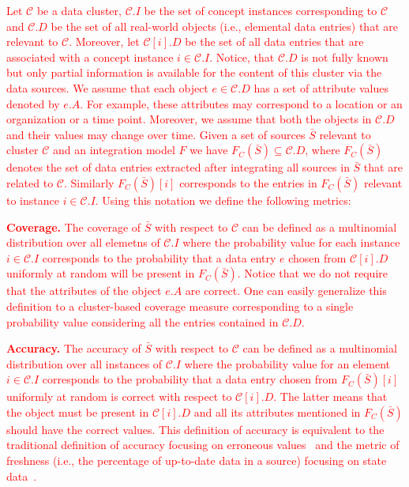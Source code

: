 \documentclass{sig-alternate}
\begin{document}
\textcolor{red}{Let $\mathcal{C}$  be a data cluster,  $\mathcal{C}.I$ be the set of concept instances corresponding to $\mathcal{C}$ and $\mathcal{C}.D$ be the set of all real-world objects (i.e., elemental data entries) that are relevant to $\mathcal{C}$. Moreover, let $\mathcal{C}[i].D$ be the set of all data entries that are associated with a concept instance $i \in \mathcal{C}.I$. Notice, that $\mathcal{C}.D$ is not fully known but only partial information is available for the content of this cluster via the data sources. We assume that each object $e \in \mathcal{C}.D$ has a set of attribute values denoted by $e.A$. For example, these attributes may correspond to a location or an organization or a time point. Moreover, we assume that both the objects in $\mathcal{C}.D$ and their values may change over time. Given a set of sources $\bar{S}$ relevant to cluster $\mathcal{C}$ and an integration model $F$ we have $F_C(\bar{S}) \subseteq \mathcal{C}.D$, where $F_C(\bar{S})$ denotes the set of data entries extracted after integrating all sources in $\bar{S}$ that are related to $\mathcal{C}$. Similarly $F_C(\bar{S})[i]$ corresponds to the entries in $F_C(\bar{S})$ relevant to instance $i \in \mathcal{C}.I$. Using this notation we define the following metrics:}

\textcolor{red}{\vspace{3pt}\noindent\textbf{Coverage.} The coverage of $\bar{S}$ with respect to $\mathcal{C}$ can be defined as a multinomial distribution over all elemetns of $\mathcal{C}.I$ where the probability value for each instance $i \in \mathcal{C}.I$ corresponds to the probability that a data entry $e$ chosen from $\mathcal{C}[i].D$ uniformly at random will be present in $F_C(\bar{S})$. Notice that we do not require that the attributes of the object $e.A$ are correct. One can easily generalize this definition to a cluster-based coverage measure corresponding to a single probability value considering all the entries contained in $\mathcal{C}.D$.}

\textcolor{red}{\vspace{3pt}\noindent\textbf{Accuracy.} The accuracy of $\bar{S}$ with respect to $\mathcal{C}$ can be defined as a multinomial distribution over all instances of $\mathcal{C}.I$ where the probability value for an element $i \in \mathcal{C}.I$ corresponds to the probability that a data entry chosen from $F_C(\bar{S})[i]$ uniformly at random is correct with respect to $\mathcal{C}[i].D$. The latter means that the object must be present in $\mathcal{C}[i].D$ and all its attributes mentioned in $F_C(\bar{S})$ should have the correct values. This definition of accuracy is equivalent to the traditional definition of accuracy focusing on erroneous values~\cite{dong:vldb13} and the metric of freshness (i.e., the percentage of up-to-date data in a source) focusing on state data~\cite{rekatsinas:2014}.}
\end{document}
